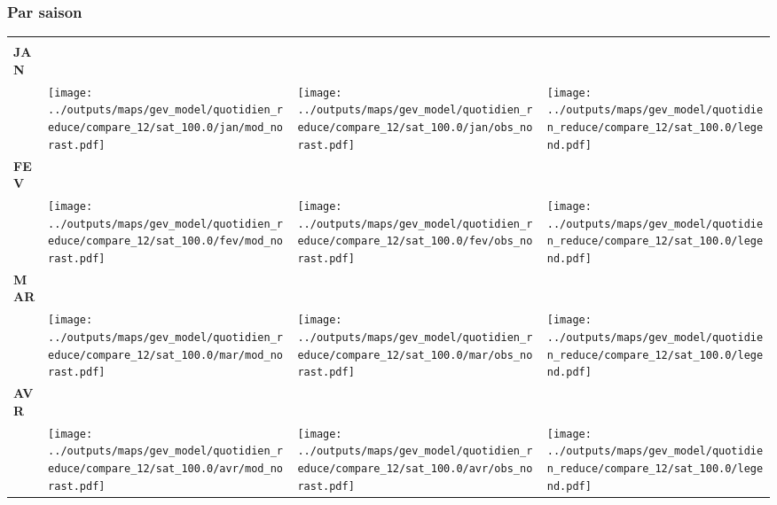 \documentclass[
  letterpaper,
  DIV=11,
  numbers=noendperiod]{scrartcl}
\begin{document}
\subsubsection{Par saison}\label{par-saison-9}

\begin{longtable*}{m{2.0cm}m{7.9cm}m{7.9cm}m{1cm}}
 & \centering  & \centering  & \tabularnewline
\centering \textbf{JAN} \\[0.2em] \begin{tabular}{r@{\hspace{0.2em}}l}\end{tabular} & \centering \texttt{[image: ../outputs/maps/gev\_model/quotidien\_reduce/compare\_12/sat\_100.0/jan/mod\_norast.pdf]} & \centering \texttt{[image: ../outputs/maps/gev\_model/quotidien\_reduce/compare\_12/sat\_100.0/jan/obs\_norast.pdf]} & \centering \texttt{[image: ../outputs/maps/gev\_model/quotidien\_reduce/compare\_12/sat\_100.0/legend.pdf]} \tabularnewline
\centering \textbf{FEV} \\[0.2em] \begin{tabular}{r@{\hspace{0.2em}}l}\end{tabular} & \centering \texttt{[image: ../outputs/maps/gev\_model/quotidien\_reduce/compare\_12/sat\_100.0/fev/mod\_norast.pdf]} & \centering \texttt{[image: ../outputs/maps/gev\_model/quotidien\_reduce/compare\_12/sat\_100.0/fev/obs\_norast.pdf]} & \centering \texttt{[image: ../outputs/maps/gev\_model/quotidien\_reduce/compare\_12/sat\_100.0/legend.pdf]} \tabularnewline
\centering \textbf{MAR} \\[0.2em] \begin{tabular}{r@{\hspace{0.2em}}l}\end{tabular} & \centering \texttt{[image: ../outputs/maps/gev\_model/quotidien\_reduce/compare\_12/sat\_100.0/mar/mod\_norast.pdf]} & \centering \texttt{[image: ../outputs/maps/gev\_model/quotidien\_reduce/compare\_12/sat\_100.0/mar/obs\_norast.pdf]} & \centering \texttt{[image: ../outputs/maps/gev\_model/quotidien\_reduce/compare\_12/sat\_100.0/legend.pdf]} \tabularnewline
\centering \textbf{AVR} \\[0.2em] \begin{tabular}{r@{\hspace{0.2em}}l}\end{tabular} & \centering \texttt{[image: ../outputs/maps/gev\_model/quotidien\_reduce/compare\_12/sat\_100.0/avr/mod\_norast.pdf]} & \centering \texttt{[image: ../outputs/maps/gev\_model/quotidien\_reduce/compare\_12/sat\_100.0/avr/obs\_norast.pdf]} & \centering \texttt{[image: ../outputs/maps/gev\_model/quotidien\_reduce/compare\_12/sat\_100.0/legend.pdf]} \tabularnewline

\end{longtable*}
\end{document}
